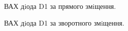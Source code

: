 \documentclass[a4paper,14pt]{extreport}
\begin{document}
\begin{figure}[h]
\caption{ВАХ дiода D1 за прямого змiщення.}
\label{ris:image04}
\end{figure}


\begin{figure}[h]
\caption{ВАХ дiода D1 за зворотного змiщення.}
\label{ris:image4}
\end{figure}
\end{document}
